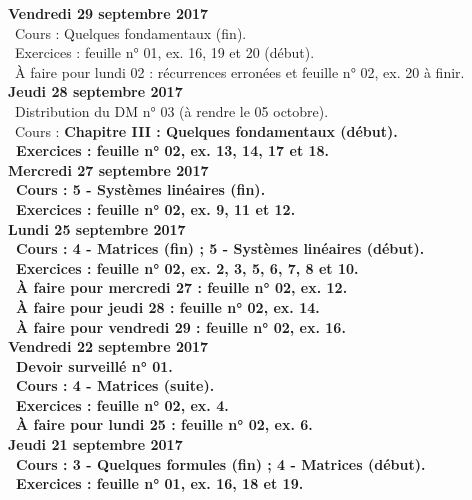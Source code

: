 \documentclass[12pt,a4paper]{article}
\begin{document}
\noindent\textbf{Vendredi 29 septembre 2017}\\
\bu\ Cours : Quelques fondamentaux (fin).\\
\bu\ Exercices : feuille n° 01, ex. 16, 19 et 20 (début).\\
\bu\ À faire pour lundi 02 : récurrences erronées et feuille n° 02, ex. 20 à finir.\vspace{.4cm}\\

\noindent\textbf{Jeudi 28 septembre 2017}\\
\bu\ Distribution du DM n° 03 (à rendre le 05 octobre).\\
\bu\ Cours : \bf Chapitre III \rm : Quelques fondamentaux (début).\\
\bu\ Exercices : feuille n° 02, ex. 13, 14, 17 et 18.\vspace{.4cm}\\

\noindent\textbf{\bf Mercredi 27 septembre 2017}\\
\bu\ Cours : 5 - Systèmes linéaires (fin).\\
\bu\ Exercices : feuille n° 02, ex. 9, 11 et 12.\vspace{.4cm}\\

\noindent\textbf{\bf Lundi 25 septembre 2017}\\
\bu\ Cours : 4 - Matrices (fin) ; 5 - Systèmes linéaires (début).\\
\bu\ Exercices : feuille n° 02, ex. 2, 3, 5, 6, 7, 8 et 10.\\
\bu\ À faire pour mercredi 27 : feuille n° 02, ex. 12.\\
\bu\ À faire pour jeudi 28 : feuille n° 02, ex. 14.\\
\bu\ À faire pour vendredi 29 : feuille n° 02, ex. 16.\vspace{.4cm}\\

\noindent\textbf{Vendredi 22 septembre 2017}\\
\bu\ Devoir surveillé n° 01.\\
\bu\ Cours : 4 - Matrices (suite).\\
\bu\ Exercices : feuille n° 02, ex. 4.\\
\bu\ À faire pour lundi 25 : feuille n° 02, ex. 6.\vspace{.4cm}\\

\noindent\textbf{Jeudi 21 septembre 2017}\\
\bu\ Cours : 3 - Quelques formules (fin) ; 4 - Matrices (début).\\
\bu\ Exercices : feuille n° 01, ex. 16, 18 et 19.\vspace{.4cm}\\
\end{document}
